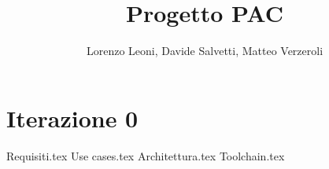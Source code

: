 \documentclass[
		a4paper,
		cleardoublepage=empty,
		headings=twolinechapter,
		numbers=autoenddot,
]{article}
\title{Progetto PAC}
\author{Lorenzo Leoni, Davide Salvetti, Matteo Verzeroli}
\begin{document}
	\maketitle
	
	
	\section{Iterazione 0}
	{Requisiti.tex}
	{Use cases.tex}
	{Architettura.tex}
	\clearpage
	{Toolchain.tex}
	
	
\end{document}
